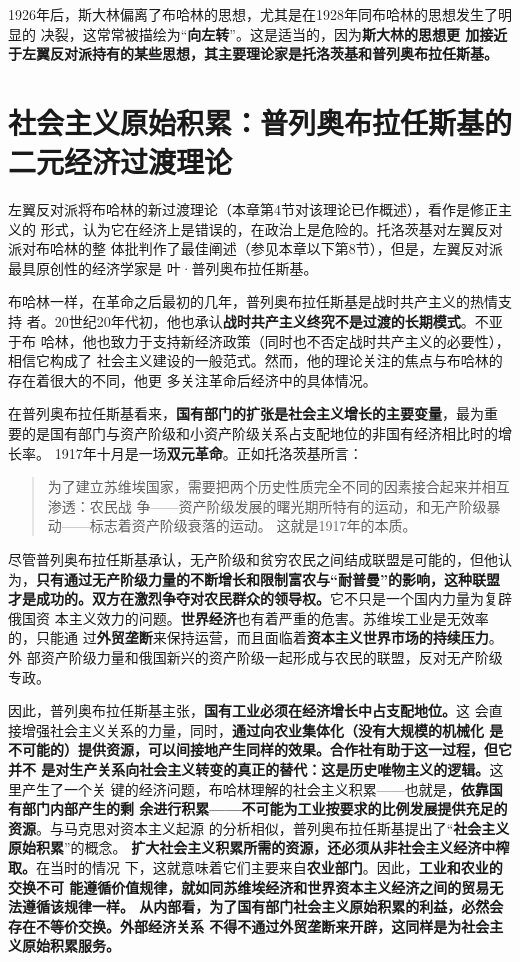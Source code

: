 1926年后，斯大林偏离了布哈林的思想，尤其是在1928年同布哈林的思想发生了明显的
决裂，这常常被描绘为“\textbf{向左转}”。这是适当的，因为\textbf{斯大林的思想更
加接近于左翼反对派持有的某些思想，其主要理论家是托洛茨基和普列奥布拉任斯基。}

\section{社会主义原始积累：普列奥布拉任斯基的二元经济过渡理论}

左翼反对派将布哈林的新过渡理论（本章第4节对该理论已作概述），看作是修正主义的
形式，认为它在经济上是错误的，在政治上是危险的。托洛茨基对左翼反对派对布哈林的整
体批判作了最佳阐述（参见本章以下第8节），但是，左翼反对派最具原创性的经济学家是
叶·普列奥布拉任斯基。

布哈林一样，在革命之后最初的几年，普列奥布拉任斯基是战时共产主义的热情支持
者。20世纪20年代初，他也承认\textbf{战时共产主义终究不是过渡的长期模式}。不亚于布
哈林，他也致力于支持新经济政策（同时也不否定战时共产主义的必要性），相信它构成了
社会主义建设的一般范式。然而，他的理论关注的焦点与布哈林的存在着很大的不同，他更
多关注革命后经济中的具体情况。

在普列奥布拉任斯基看来，\textbf{国有部门的扩张是社会主义增长的主要变量}，最为重
要的是国有部门与资产阶级和小资产阶级关系占支配地位的非国有经济相比时的增长率。
1917年十月是一场\textbf{双元革命}。正如托洛茨基所言：
\begin{quotation}
  为了建立苏维埃国家，需要把两个历史性质完全不同的因素接合起来并相互渗透：农民战
  争——资产阶级发展的曙光期所特有的运动，和无产阶级暴动——标志着资产阶级衰落的运动。
  这就是1917年的本质。
\end{quotation}

尽管普列奥布拉任斯基承认，无产阶级和贫穷农民之间结成联盟是可能的，但他认
为，\textbf{只有通过无产阶级力量的不断增长和限制富农与“耐普曼”的影响，这种联盟
  才是成功的。双方在激烈争夺对农民群众的领导权。}它不只是一个国内力量为复辟俄国资
本主义效力的问题。\textbf{世界经济}也有着严重的危害。苏维埃工业是无效率的，只能通
过\textbf{外贸垄断}来保持运营，而且面临着\textbf{资本主义世界市场的持续压力}。外
部资产阶级力量和俄国新兴的资产阶级一起形成与农民的联盟，反对无产阶级专政。

因此，普列奥布拉任斯基主张，\textbf{国有工业必须在经济增长中占支配地位。}这
会直接增强社会主义关系的力量，同时，\textbf{通过向农业集体化（没有大规模的机械化
是不可能的）提供资源，可以间接地产生同样的效果。合作社有助于这一过程，但它并不
是对生产关系向社会主义转变的真正的替代：这是历史唯物主义的逻辑。}这里产生了一个关
键的经济问题，布哈林理解的社会主义积累——也就是，\textbf{依靠国有部门内部产生的剩
余进行积累——不可能为工业按要求的比例发展提供充足的资源}。与马克思对资本主义起源
的分析相似，普列奥布拉任斯基提出了“\textbf{社会主义原始积累}”的概念。
\textbf{扩大社会主义积累所需的资源，还必须从非社会主义经济中榨取。}在当时的情况
下，这就意味着它们主要来自\textbf{农业部门}。因此，\textbf{工业和农业的交换不可
能遵循价值规律，就如同苏维埃经济和世界资本主义经济之间的贸易无法遵循该规律一样。
从内部看，为了国有部门社会主义原始积累的利益，必然会存在不等价交换。外部经济关系
不得不通过外贸垄断来开辟，这同样是为社会主义原始积累服务。}

